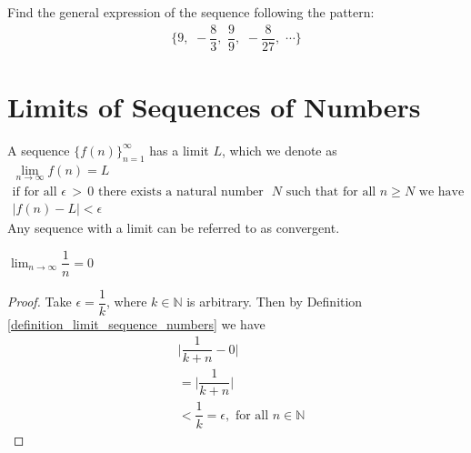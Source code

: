 \begin{exercise}
Find the general expression of the sequence following the pattern:
\begin{align*}
    \Big\{9, \hspace{4pt} -\dfrac{8}{3}, \hspace{4pt} \dfrac{9}{9}, \hspace{4pt} -\dfrac{8}{27}, \hspace{4pt} \cdots \Big\}
\end{align*}
\end{exercise}

\newpage
\section{Limits of Sequences of Numbers}\label{limits_of_sequences_of_numbers}

\begin{definition}
A sequence $\{f(n)\}_{n=1}^{\infty}$ has a limit $L$, which we denote as 
\begin{align*}
    \lim_{n \longrightarrow \infty} f(n) = L\\[2ex]
    \text{if for all} \hspace{4pt} \epsilon \hspace{2pt} > \hspace{2pt} 0 \hspace{4pt} \text{there exists a natural number} \hspace{4pt} &N \hspace{4pt} \text{such that for all} \hspace{4pt} n \geq N \hspace{4pt} \text{we have}\\[2ex]
    \lvert f(n) - L \rvert < \epsilon
\end{align*}
Any sequence with a limit can be referred to as convergent.
\label{definition_limit_sequence_numbers}
\end{definition}

\begin{example}
$\lim_{n \longrightarrow \infty} \dfrac{1}{n} = 0$
\begin{proof}
Take $\epsilon = \dfrac{1}{k}$, where $k \in \mathbb{N}$ is arbitrary. Then by Definition \ref{definition_limit_sequence_numbers} we have
\begin{align*}
    &\Big\lvert \dfrac{1}{k+n} - 0 \Big\rvert\\[2ex]
    &= \Big\lvert \dfrac{1}{k+n} \Big\rvert\\[2ex]
    &< \dfrac{1}{k} = \epsilon, \hspace{4pt} \text{for all} \hspace{4pt} n \in \mathbb{N}
\end{align*}
\end{proof}
\label{limit_one_over_n}
\end{example}

